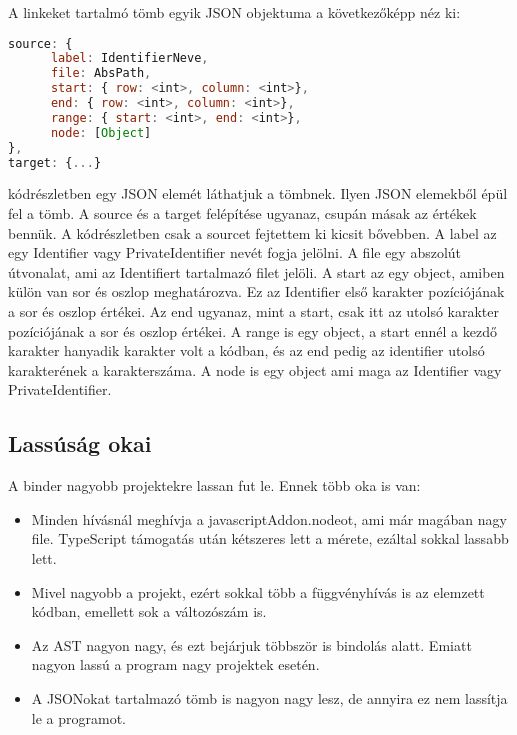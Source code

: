 A linkeket tartalmó tömb egyik JSON objektuma a következőképp néz ki:

\begin{lstlisting}[caption={Binder JSON argumentuma}, label={lst:binder_json_arg}, language={JavaScript}]
source: {
      label: IdentifierNeve,
      file: AbsPath,
      start: { row: <int>, column: <int>},
      end: { row: <int>, column: <int>},
      range: { start: <int>, end: <int>},
      node: [Object]
},
target: {...}
\end{lstlisting}

 kódrészletben egy JSON elemét láthatjuk a tömbnek. Ilyen JSON elemekből épül fel a tömb.
A source és a target felépítése ugyanaz, csupán másak az értékek bennük.
A kódrészletben csak a sourcet fejtettem ki kicsit bővebben. A label az egy Identifier vagy PrivateIdentifier nevét fogja jelölni.
A file egy abszolút útvonalat, ami az Identifiert tartalmazó filet jelöli.
A start az egy object, amiben külön van sor és oszlop meghatározva. Ez az Identifier első karakter pozíciójának a sor és oszlop értékei.
Az end ugyanaz, mint a start, csak itt az utolsó karakter pozíciójának a sor és oszlop értékei.
A range is egy object, a start ennél a kezdő karakter hanyadik karakter volt a kódban, és az end pedig az identifier utolsó karakterének a karakterszáma.
A node is egy object ami maga az Identifier vagy PrivateIdentifier.

\subsection{Lassúság okai}

A binder nagyobb projektekre lassan fut le. Ennek több oka is van:

\begin{itemize}
      \item Minden hívásnál meghívja a javascriptAddon.nodeot, ami már magában nagy file. TypeScript támogatás után kétszeres lett a mérete, ezáltal sokkal lassabb lett.
      \item Mivel nagyobb a projekt, ezért sokkal több a függvényhívás is az elemzett kódban, emellett sok a változószám is.
      \item Az AST nagyon nagy, és ezt bejárjuk többször is bindolás alatt. Emiatt nagyon lassú a program nagy projektek esetén.
      \item A JSONokat tartalmazó tömb is nagyon nagy lesz, de annyira ez nem lassítja le a programot.
\end{itemize}

